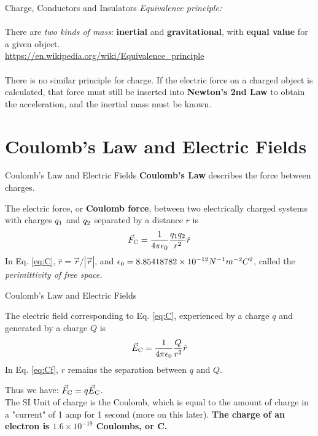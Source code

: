 \documentclass{beamer}
\begin{document}
\begin{frame}{Charge, Conductors and Insulators}
\small
\textit{Equivalence principle:} \\ \hrulefill \\
There are \textit{two kinds of mass}: \textbf{inertial} and \textbf{gravitational}, with \textbf{equal value} for a given object. \\ \vspace{0.5cm}
\url{https://en.wikipedia.org/wiki/Equivalence_principle} \\
\hrulefill \\
There is no similar principle for charge.  If the electric force on a charged object is calculated, that force must still be inserted into \textbf{Newton's 2nd Law} to obtain the acceleration, and the inertial mass must be known.
\end{frame}

\section{Coulomb’s Law and Electric Fields}

\begin{frame}{Coulomb’s Law and Electric Fields}
\textbf{Coulomb's Law} describes the force between charges. \\ \vspace{0.5cm}
\begin{tcolorbox}[colback=white,colframe=black!100!black,title=Coulomb's Law]
\alert{The electric force, or \textbf{Coulomb force}, between two electrically charged systems with charges $q_{\rm 1}$ and $q_{\rm 2}$ separated by a distance $r$ is
\begin{equation}
\vec{F}_{\rm C} = \frac{1}{4\pi\epsilon_{\rm 0}} \frac{q_{\rm 1} q_{\rm 2}}{r^2} \hat{r} \label{eq:C}
\end{equation}
In Eq. \ref{eq:C}, $\hat{r} = \vec{r}/|\vec{r}|$, and $\epsilon_{\rm 0} = 8.85418782\times 10^{-12} N^{-1} m^{-2} C^2$, called the \textit{perimittivity of free space.}}
\end{tcolorbox}
\end{frame}

\begin{frame}{Coulomb’s Law and Electric Fields}
\begin{tcolorbox}[colback=white,colframe=black!100!black,title=Coulomb Field]
\alert{The electric field corresponding to Eq. \ref{eq:C}, experienced by a charge $q$ and generated by a charge $Q$ is 
\begin{equation}
\vec{E}_{\rm C} = \frac{1}{4\pi\epsilon_{\rm 0}} \frac{Q}{r^2} \hat{r} \label{eq:Cf}
\end{equation}
In Eq. \ref{eq:Cf}, $r$ remains the separation between $q$ and $Q$.}
\end{tcolorbox}
Thus we have: $\vec{F}_{\rm C} = q \vec{E}_{\rm C}$. \\ \vspace{0.5cm}
The SI Unit of charge is the Coulomb, which is equal to the amount of charge in a "current" of 1 amp for 1 second (more on this later).  \textbf{The charge of an electron is $1.6\times 10^{-19}$ Coulombs, or C.}
\end{frame}
\end{document}
